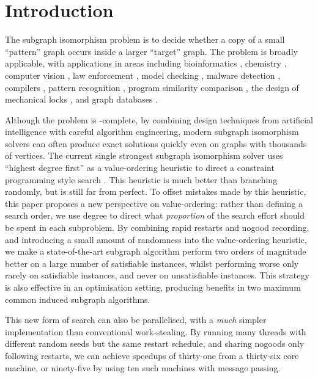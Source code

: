 \documentclass[runningheads]{llncs}
\begin{document}
\section{Introduction}

The subgraph isomorphism problem is to decide whether a copy of a small ``pattern'' graph occurs
inside a larger ``target'' graph. The problem is broadly applicable, with applications in areas
including bioinformatics \cite{DBLP:journals/bmcbi/BonniciGPSF13}, chemistry \cite{o:Regin95}, computer vision
\cite{DBLP:journals/cviu/DamiandSHJS11,DBLP:journals/pr/SolnonDHJ15}, law enforcement
\cite{DBLP:journals/cacm/CoffmanGM04}, model checking \cite{DBLP:journals/tcs/SevegnaniC15},
malware detection \cite{DBLP:conf/dimva/BruschiMM06}, compilers
\cite{DBLP:conf/cgo/MurrayF12,DBLP:conf/cp/BlindellLCS15}, pattern recognition
\cite{DBLP:journals/ijprai/FoggiaPV14}, program similarity
comparison \cite{o:DallaPredaV17}, the design of mechanical locks
\cite{DBLP:journals/siamrev/VomelLBF17}, and graph databases
\cite{DBLP:journals/jair/McCreeshPST18}.

Although the problem is \NP-complete, by combining design techniques from artificial intelligence
with careful algorithm engineering, modern subgraph isomorphism solvers can often produce exact
solutions quickly even on graphs with thousands of vertices. The current single strongest subgraph
isomorphism solver uses ``highest degree first'' as a value-ordering heuristic to direct a
constraint programming style search
\cite{DBLP:conf/cp/McCreeshP15,DBLP:conf/lion/KotthoffMS16,DBLP:journals/jair/McCreeshPST18}. This
heuristic is much better than branching randomly, but is still far from perfect. To offset mistakes
made by this heuristic, this paper proposes a new perspective on value-ordering: rather than
defining a search order, we use degree to direct what \emph{proportion} of the search effort should
be spent in each subproblem. By combining rapid restarts and nogood recording, and introducing a
small amount of randomness into the value-ordering heuristic, we make a state-of-the-art subgraph
algorithm perform two orders of magnitude better on a large number of satisfiable instances, whilst
performing worse only rarely on satisfiable instances, and never on unsatisfiable instances.  This
strategy is also effective in an optimisation setting, producing benefits in two maximum common
induced subgraph algorithms.

This new form of search can also be parallelised, with a \emph{much} simpler implementation than
conventional work-stealing. By running many threads with different random seeds but the same restart
schedule, and sharing nogoods only following restarts, we can achieve speedups of thirty-one from a
thirty-six core machine, or ninety-five by using ten such machines with message passing.
\end{document}
